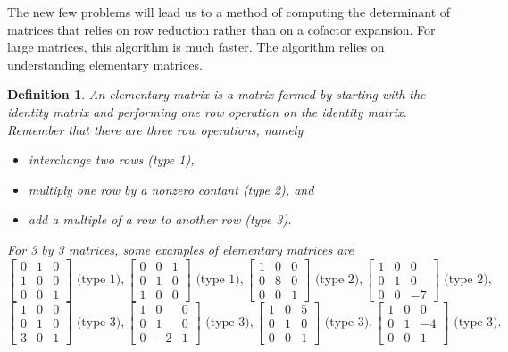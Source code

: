 \documentclass[letterpaper,oneside]{book}%
\theoremstyle{plain}
\theoremstyle{box}
\newtheorem{definition}[theorem]{Definition}
\theoremstyle{problem}
\newcommand{\bvec}[1]{\begin{bmatrix} #1 \end{bmatrix}}
\begin{document}
The new few problems will lead us to a method of computing the determinant of matrices that relies on row reduction rather than on a cofactor expansion. For large matrices, this algorithm is much faster.  The algorithm relies on understanding elementary matrices.
\begin{definition}
 An elementary matrix is a matrix formed by starting with the identity matrix and performing one row operation on the identity matrix.  Remember that there are three row operations, namely
 \begin{itemize}
  \item interchange two rows (type 1),
  \item multiply one row by a nonzero contant (type 2), and
  \item add a multiple of a row to another row (type 3).
 \end{itemize}
 For 3 by 3 matrices, some examples of elementary matrices are
$$
\bvec{
 0&1&0\\
 1&0&0\\
 0&0&1
}\text{ (type 1)},
\bvec{
 0&0&1\\
 0&1&0\\
 1&0&0
}\text{ (type 1)},
\bvec{
 1&0&0\\
 0&8&0\\
 0&0&1
}\text{ (type 2)},
\bvec{
 1&0&0\\
 0&1&0\\
 0&0&-7
}\text{ (type 2)},
$$
$$\bvec{
 1&0&0\\
 0&1&0\\
 3&0&1
}\text{ (type 3)},
\bvec{
 1&0&0\\
 0&1&0\\
 0&-2&1
}\text{ (type 3)},
\bvec{
 1&0&5\\
 0&1&0\\
 0&0&1
}\text{ (type 3)},
\bvec{
 1&0&0\\
 0&1&-4\\
 0&0&1
}\text{ (type 3)}.
$$
\end{definition}
\end{document}
